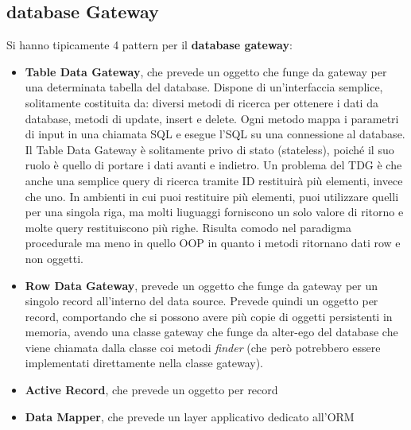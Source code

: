 \subsection{database Gateway}
Si hanno tipicamente 4 pattern per il \textbf{database gateway}:
\begin{itemize}
    \item \textbf{Table Data Gateway}, che prevede un oggetto che funge da gateway per una determinata tabella del database. Dispone di un'interfaccia semplice, solitamente costituita da: diversi metodi di ricerca per ottenere i dati da database, metodi di update, insert e delete. Ogni metodo mappa i parametri di input in una chiamata SQL e esegue l'SQL su una connessione al database. Il Table Data Gateway è solitamente privo di stato (stateless), poiché il suo ruolo è quello di portare i dati avanti e indietro. Un problema del TDG è che anche una semplice query di ricerca tramite ID restituirà più elementi, invece che uno. In ambienti in cui puoi restituire più elementi, puoi utilizzare quelli per una singola riga, ma molti liuguaggi forniscono un solo valore di ritorno e molte query restituiscono più righe. Risulta comodo nel paradigma procedurale ma meno in quello OOP in quanto i metodi ritornano dati row e non oggetti.
    \item \textbf{Row Data Gateway}, prevede un oggetto che funge da gateway per un singolo record all'interno del data source. Prevede quindi un oggetto per record, comportando che si possono avere più copie di oggetti persistenti in memoria, avendo una classe gateway che funge da alter-ego del database che viene chiamata dalla classe coi metodi \textit{finder} (che però potrebbero essere implementati direttamente nella classe gateway).
    \item \textbf{Active Record}, che prevede un oggetto per record
    \item \textbf{Data Mapper}, che prevede un layer applicativo dedicato all'ORM
\end{itemize}
